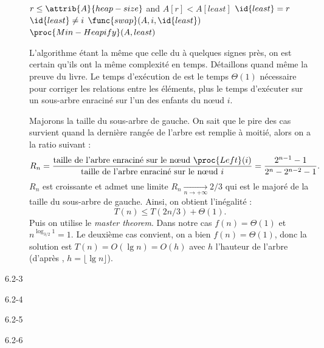 \begin{description}
\begin{ex}
\begin{codebox}
        \li \If $r \le \attrib{A}{heap-size}$ and $A[r] < A[least]$ \Do
        \li $\id{least} = r$  \End    
        \li \If $\id{least} \ne i$ \Do
        \li $\func{swap}(A,i,\id{least})$
        \li $\proc{Min-Heapify}(A,least)$
      \end{codebox}
      L'algorithme \'etant la m\^eme que celle du  \`a quelques signes pr\`es, on est certain qu'ils ont la m\^eme complexit\'e en temps. D\'etaillons quand m\^eme la preuve du livre. 
      Le temps d'ex\'ecution de  est le temps $\Theta(1)$ n\'ecessaire pour corriger les relations entre les \'el\'ements, plus le temps d'ex\'ecuter  sur un sous-arbre enracin\'e sur l'un des enfants du n\oe ud $i$. 
      
      Majorons la taille du sous-arbre de gauche.  On sait que le pire des cas survient quand la derni\`ere rang\'ee de l'arbre est remplie \`a moiti\'e, alors on a la ratio suivant : 
      \[R_n = \frac{\textrm{taille de l'arbre enracin\'e sur le n\oe ud  } \proc{Left}(i)}{\textrm{taille de l'arbre enracin\'e sur le n\oe ud } i} = \frac{2^{n-1}-1}{2^n-2^{n-2}-1}.\]
      $R_n$ est croissante et admet une limite $R_n \underset{n \to +\infty}{\longrightarrow} 2/3$ qui est le major\'e de la taille du sous-arbre de gauche. Ainsi, on obtient l'in\'egalit\'e : \[T(n) \le T(2n/3) + \Theta(1).\]
      Puis on utilise le \textit{master theorem}. Dans notre cas $f(n) = \Theta(1)$ et $n^{\log_{3/2}1} = 1$. Le deuxi\`eme cas convient, on a bien $f(n) = \Theta(1)$, donc la solution est $T(n) = O(\lg n) = O(h)$ avec $h$ l'hauteur de l'arbre (d'apr\`es , $h = \lfloor \lg n \rfloor$). 
    \end{ex}
  \item[6.2-3] \textit{}
    \begin{exrev}
      
    \end{exrev}
  \item[6.2-4] \textit{}
    \begin{exrev}
      
    \end{exrev}
  \item[6.2-5] \textit{}
    \begin{exrev}
      
    \end{exrev}
  \item[6.2-6] \textit{}
    \begin{exrev}
      
    \end{exrev}
\end{description}
